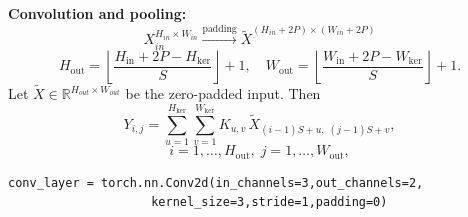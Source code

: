\documentclass[8pt,twocolumn]{article}
\begin{document}
\textbf{Convolution and pooling:}
\[X_{in}^{H_{in}\times W_{in}} \xrightarrow{\text{padding}} \tilde{X}^{(H_{in}+2P)\times(W_{in}+2P)} \]
\[
H_{\text{out}}
= \left\lfloor \frac{H_{\text{in}} + 2P - H_{\text{ker}}}{S} \right\rfloor + 1,
\quad
W_{\text{out}}
= \left\lfloor \frac{W_{\text{in}} + 2P - W_{\text{ker}}}{S} \right\rfloor + 1.
\]
Let \(\tilde X\in\mathbb{R}^{H_{out} \times W_{out}}\) be the zero-padded input.  Then
\[
Y_{i,j}
= \sum_{u=1}^{H_{\text{ker}}}\sum_{v=1}^{W_{\text{ker}}}
  K_{u,v}\,\tilde X_{(i-1)S + u,\;(j-1)S + v},
\]\[
i=1,\dots,H_{\text{out}},\;
j=1,\dots,W_{\text{out}},
\]
\noindent{}\vspace{-0.6em}
\begin{lstlisting}
conv_layer = torch.nn.Conv2d(in_channels=3,out_channels=2,
                    kernel_size=3,stride=1,padding=0)
\end{lstlisting}\vspace{-0.6em}\vspace{-0.6em}
\end{document}
